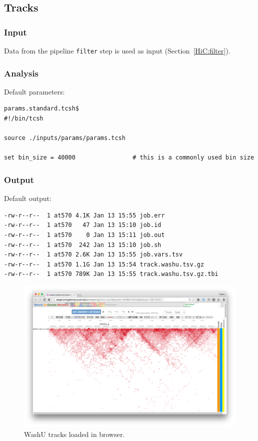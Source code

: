 \subsection{Tracks}\label{HiC:tracks}%
\subsubsection{Input} %
Data from the pipeline \texttt{filter} step is used as input (Section~\ref{HiC:filter}).
\subsubsection{Analysis} %
Default parameters:
\begin{lstlisting}
params.standard.tcsh$
#!/bin/tcsh

source ./inputs/params/params.tcsh

set bin_size = 40000                # this is a commonly used bin size
\end{lstlisting}
\subsubsection{Output} %
Default output: %
\begin{lstlisting}
-rw-r--r--  1 at570 4.1K Jan 13 15:55 job.err
-rw-r--r--  1 at570   47 Jan 13 15:10 job.id
-rw-r--r--  1 at570    0 Jan 13 15:11 job.out
-rw-r--r--  1 at570  242 Jan 13 15:10 job.sh
-rw-r--r--  1 at570 2.6K Jan 13 15:55 job.vars.tsv
-rw-r--r--  1 at570 1.1G Jan 13 15:54 track.washu.tsv.gz
-rw-r--r--  1 at570 789K Jan 13 15:55 track.washu.tsv.gz.tbi
\end{lstlisting}
\begin{figure}[!htb]
    \centering
    \includegraphics[width=\textwidth,height=\textheight,keepaspectratio]{figure/WashU_session}
    \caption{WashU tracks loaded in browser.} %
    \label{fig:hicplotter_chr8}
\end{figure}
\clearpage